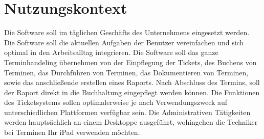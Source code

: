 \chapter{Nutzungskontext}
Die Software soll im täglichen Geschäfts des Unternehmens eingesetzt werden. Die Software soll die aktuellen Aufgaben der Benutzer vereinfachen und sich optimal in den Arbeitsalltag integrieren. Die Software soll das ganze Terminhandeling übernehmen von der Einpflegung der Tickets, des Buchens von Terminen, das Durchführen von Terminen, das Dokumentieren von Terminen, sowie das anschließende erstellen eines Raports. Nach Abschluss des Termins, soll der Raport direkt in die Buchhaltung eingepflegt werden können. Die Funktionen des Ticketsystems sollen optimalerweise je nach Verwendungszweck auf unterschiedlichen Plattformen verfügbar sein. Die Administrativen Tätigkeiten werden hauptsächlich an einem Desktoppc ausgeführt, wohingehen die Techniker bei Terminen Ihr iPad verwenden möchten.